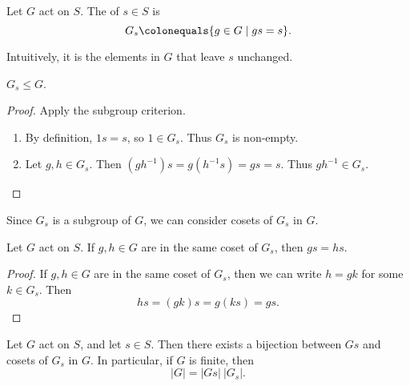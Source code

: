 \begin{definition}[Stabiliser]
Let $G$ act on $S$. The  of $s\in S$ is
\[G_s\colonequals\{g\in G\mid gs=s\}.\]
\end{definition}

Intuitively, it is the elements in $G$ that leave $s$ unchanged.

\begin{lemma*}
$G_s\le G$.
\end{lemma*}

\begin{proof}
Apply the subgroup criterion.
\begin{enumerate}[label=(\roman*)]
\item By definition, $1s=s$, so $1\in G_s$. Thus $G_s$ is non-empty. 
\item Let $g,h\in G_s$. Then $(gh^{-1})s=g(h^{-1} s)=gs=s$. Thus $gh^{-1}\in G_s$.
\end{enumerate}
\end{proof}

Since $G_s$ is a subgroup of $G$, we can consider cosets of $G_s$ in $G$.

\begin{lemma}
Let $G$ act on $S$. If $g,h\in G$ are in the same coset of $G_s$, then $gs=hs$.
\end{lemma}

\begin{proof}
If $g,h\in G$ are in the same coset of $G_s$, then we can write $h=gk$ for some $k\in G_s$. Then
\[hs=(gk)s=g(ks)=gs.\]
\end{proof}

\begin{theorem}
Let $G$ act on $S$, and let $s\in S$. Then there exists a bijection between $Gs$ and cosets of $G_s$ in $G$. In particular, if $G$ is finite, then
\begin{equation}
|G|=|Gs|\:|G_s|.
\end{equation}
\end{theorem}

